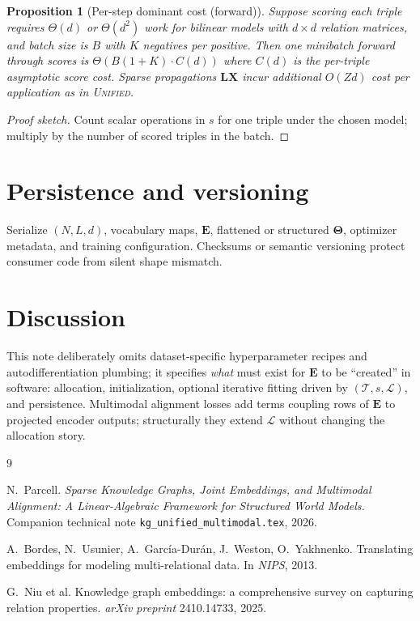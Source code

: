 \documentclass[11pt]{article}
\newtheorem{proposition}{Proposition}
\begin{document}
\begin{proposition}[Per-step dominant cost (forward)]
\label{prop:batch-cost}
Suppose scoring each triple requires $\Theta(d)$ or $\Theta(d^2)$ work for bilinear models with $d \times d$ relation matrices, and batch size is $B$ with $K$ negatives per positive.
Then one minibatch forward through scores is $\Theta(B(1+K)\cdot C(d))$ where $C(d)$ is the per-triple asymptotic score cost.
Sparse propagations $\bm{L}\bm{X}$ incur additional $O(Zd)$ cost per application as in \textsc{Unified}.
\end{proposition}

\begin{proof}[Proof sketch]
Count scalar operations in $s$ for one triple under the chosen model; multiply by the number of scored triples in the batch.
\end{proof}

\section{Persistence and versioning}
Serialize $(N,L,d)$, vocabulary maps, $\bm{E}$, flattened or structured $\bm{\Theta}$, optimizer metadata, and training configuration.
Checksums or semantic versioning protect consumer code from silent shape mismatch.

\section{Discussion}
This note deliberately omits dataset-specific hyperparameter recipes and autodifferentiation plumbing; it specifies \emph{what} must exist for $\bm{E}$ to be ``created'' in software: allocation, initialization, optional iterative fitting driven by $(\mathcal{T}, s, \mathcal{L})$, and persistence.
Multimodal alignment losses add terms coupling rows of $\bm{E}$ to projected encoder outputs; structurally they extend $\mathcal{L}$ without changing the allocation story.

\begin{thebibliography}{9}

N.~Parcell.
\newblock \emph{Sparse Knowledge Graphs, Joint Embeddings, and Multimodal Alignment: A Linear-Algebraic Framework for Structured World Models.}
\newblock Companion technical note \texttt{kg\_unified\_multimodal.tex}, 2026.

A.~Bordes, N.~Usunier, A.~Garc\'ia-Dur\'an, J.~Weston, O.~Yakhnenko.
\newblock Translating embeddings for modeling multi-relational data.
\newblock In \emph{NIPS}, 2013.

G.~Niu et al.
\newblock Knowledge graph embeddings: a comprehensive survey on capturing relation properties.
\newblock \emph{arXiv preprint} 2410.14733, 2025.

\end{thebibliography}
\end{document}
